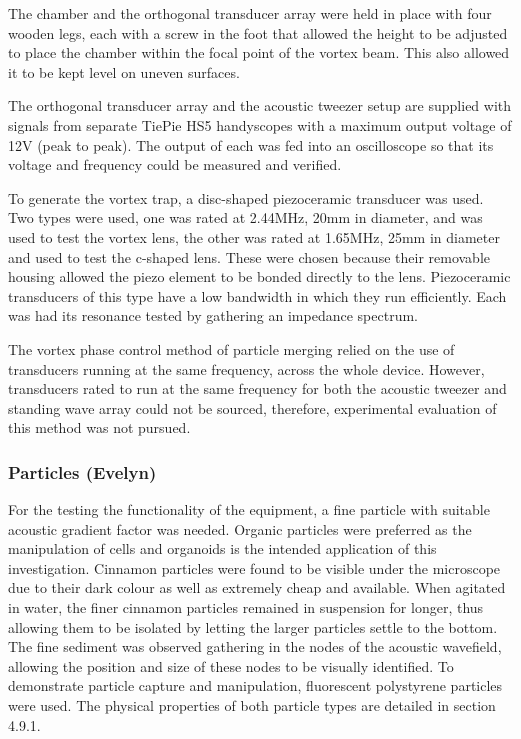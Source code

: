 \documentclass[11pt,a4paper]{article}
\begin{document}
The chamber and the orthogonal transducer array were held in place with four wooden legs, each with a screw in the foot that allowed the height to be adjusted to place the chamber within the focal point of the vortex beam. This also allowed it to be kept level on uneven surfaces.

The orthogonal transducer array and the acoustic tweezer setup are supplied with signals from separate TiePie HS5 handyscopes with a maximum output voltage of 12V (peak to peak). The output of each was fed into an oscilloscope so that its voltage and frequency could be measured and verified.

To generate the vortex trap, a disc-shaped piezoceramic transducer was used. Two types were used, one was rated at 2.44MHz, 20mm in diameter, and was used to test the vortex lens, the other was rated at 1.65MHz, 25mm in diameter and used to test the c-shaped lens. These were chosen because their removable housing allowed the piezo element to be bonded directly to the lens. Piezoceramic transducers of this type have a low bandwidth in which they run efficiently. Each was had its resonance tested by gathering an impedance spectrum.

The vortex phase control method of particle merging relied on the use of transducers running at the same frequency, across the whole device. However, transducers rated to run at the same frequency for both the acoustic tweezer and standing wave array could not be sourced, therefore, experimental evaluation of this method was not pursued.

\subsubsection{Particles (Evelyn)}

For the testing the functionality of the equipment, a fine particle with suitable acoustic gradient factor was needed. Organic particles were preferred as the manipulation of cells and organoids is the intended application of this investigation. Cinnamon particles were found to be visible under the microscope due to their dark colour as well as extremely cheap and available. When agitated in water, the finer cinnamon particles remained in suspension for longer, thus allowing them to be isolated by letting the larger particles settle to the bottom. The fine sediment was observed gathering in the nodes of the acoustic wavefield, allowing the position and size of these nodes to be visually identified. To demonstrate particle capture and manipulation, fluorescent polystyrene particles were used. The physical properties of both particle types are detailed in section 4.9.1.
\end{document}
